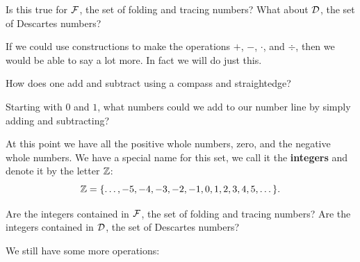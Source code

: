 \begin{question}
Is this true for $\mathcal F$, the set of folding and tracing numbers? What about
$\mathcal D$, the set of Descartes numbers?
\end{question}
\QM

If we could use constructions to make the operations $+$, $-$, $\cdot$, and $\div$, then we would be able to say a lot more.  In fact we will  do just this. 

\begin{question} 
How does one add and subtract using a compass and straightedge?
\end{question} 
\QM

\begin{question} 
Starting with $0$ and $1$, what numbers could we add to our number
line by simply adding and subtracting?
\end{question}

At this point we have all the positive whole numbers, zero, and the
negative whole numbers. We have a special name for this set, we call
it the \textbf{integers} and denote it by the letter
$\mathbb Z$:
\[
\Z = \{\dots, -5, -4, -3, -2, -1, 0, 1,2,3,4,5,\dots \}. \index{Z@$\Z$}
\]
\begin{question}
Are the integers contained in $\mathcal F$, the set of folding and tracing numbers? Are
the integers contained in $\mathcal D$, the set of Descartes numbers?
\end{question}
\QM

We still have some more operations:

